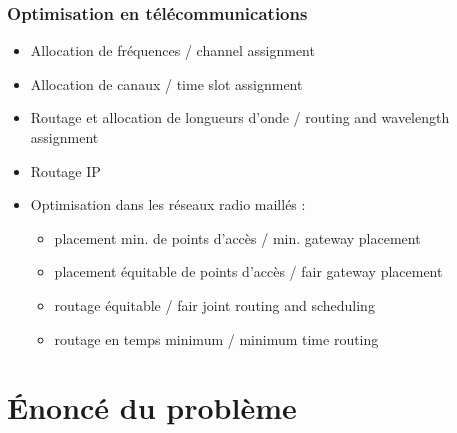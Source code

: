 \documentclass{beamer}
\begin{document}
\begin{frame}
  \frametitle{Optimisation en télécommunications}

  \begin{itemize}
  \item Allocation de fréquences / channel assignment
  \item Allocation de canaux / time slot assignment
  \item Routage et allocation de longueurs d'onde / routing and wavelength assignment
  \item Routage IP
  \item Optimisation dans les réseaux radio maillés :
    \begin{itemize}
    \item placement min. de points d'accès / min. gateway placement
    \item placement équitable de points d'accès / fair gateway placement
    \item routage équitable / fair joint routing and scheduling
    \item routage en temps minimum / minimum time routing
    \end{itemize}
  \end{itemize}
  
\end{frame}

\section{\'Enoncé du problème}
\end{document}
